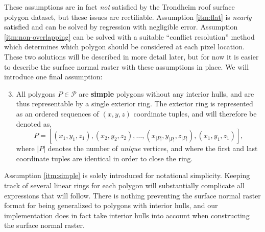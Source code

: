 These assumptions are in fact \emph{not} satisfied by the Trondheim roof surface polygon dataset, but these issues are rectifiable.
Assumption \ref{itm:flat} is \textit{nearly} satisfied and can be solved by regression with negligible error.
Assumption \ref{itm:non-overlapping} can be solved with a suitable \enquote{conflict resolution} method which determines which polygon should be considered at each pixel location.
These two solutions will be described in more detail later, but for now it is easier to describe the surface normal raster with these assumptions in place.
We will introduce one final assumption:
\begin{enumerate}
  \setcounter{enumi}{2}
  \item \label{itm:simple} All polygons $P \in \mathcal{P}$ are \textbf{simple} polygons without any interior hulls, and are thus representable by a single exterior ring.
   The exterior ring is represented as an ordered sequences of $(x, y, z)$ coordinate tuples, and will therefore be denoted as,
    \begin{equation*}
      P = [(x_1, y_1, z_1), (x_2, y_2, z_2), \dots, (x_{|P|}, y_{|P|}, z_{|P|}), (x_1, y_1, z_1)],
    \end{equation*}
    where $|P|$ denotes the number of \emph{unique} vertices, and where the first and last coordinate tuples are identical in order to close the ring.
\end{enumerate}
Assumption \ref{itm:simple} is solely introduced for notational simplicity.
Keeping track of several linear rings for each polygon will substantially complicate all expressions that will follow.
There is nothing preventing the surface normal raster format for being generalized to polygons with interior hulls, and our implementation does in fact take interior hulls into account when constructing the surface normal raster.

